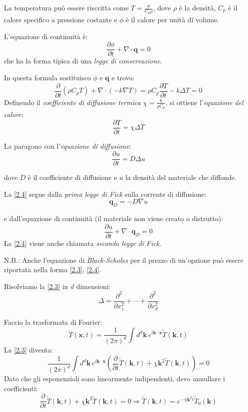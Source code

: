 \documentclass[a4paper,11pt]{report}
\newcommand{\vect}[1]{\boldsymbol{#1}}
\newcommand{\x}{\boldsymbol{x}}
\newcommand{\kk}{\boldsymbol{k}}
\begin{document}
La temperatura pu\`o essere riscritta come $T=\frac{\phi}{C_p \rho}$, dove $\rho$ \`e la densit\`a, $C_p$ \`e il calore specifico a pressione costante e $\phi$ \`e il calore per unit\`a di volume.

L'equazione di continuit\`a \`e:
\begin{equation}
\frac{\partial \phi}{\partial t} + \nabla\cdot\vect{q}=0
\end{equation}
che ha la forma tipica di una \emph{legge di conservazione}.

In questa formula sostituisco $\phi$ e $\vect{q}$ e trovo:
\[
\frac{\partial}{\partial t}(\rho C_p T) + \nabla\cdot(-k\nabla T) = \rho C_p \frac{\partial T}{\partial t} - k \Delta T=0
\]
Definendo il \emph{coefficiente di diffusione termica} $\chi=\frac{k}{\rho C_p}$, si ottiene l'\emph{equazione del calore}:
\begin{equation}
\frac{\partial T}{\partial t}=\chi \Delta T
\label{2.3}
\end{equation}

La paragono con l'\emph{equazione di diffusione}:
\begin{equation}
\frac{\partial u}{\partial t}=D \Delta u
\label{2.4}
\end{equation}

dove $D$ \`e il coefficiente di diffusione e $u$ la densit\`a del materiale che diffonde.

La \eqref{2.4} segue dalla \emph{prima legge di Fick} sulla corrente di diffusione:
\begin{equation}
\vect{q}_{D}=-D{\nabla}u
\end{equation}

e dall'equazione di continuit\`a (il materiale non viene creato o distrutto):
\[
\frac{\partial u}{\partial t}+{\nabla}\cdot\vect{q}_D=0
\]
La \eqref{2.4} viene anche chiamata \emph{seconda legge di Fick}.

N.B.: Anche l'equazione di \emph{Black-Scholes} per il prezzo di un'opzione pu\`o essere riportata nella forma \eqref{2.3}, \eqref{2.4}.

\medskip

Risolviamo la \eqref{2.3} in $d$ dimensioni:
\begin{equation}
\Delta=\frac{\partial^2}{\partial x_{1}^2}+\cdots+\frac{\partial^2}{\partial x_{d}^2} 
\end{equation}

Faccio la trasformata di Fourier:
\begin{equation}
T(\x,t)=\frac{1}{(2\pi)^d}\int d^d\kk\, e^{i\kk\cdot\x}\tilde{T}(\kk,t) 
\label{2.7}
\end{equation}
La \eqref{2.3} diventa:
\[
\frac{1}{(2\pi)^d}\int d^d \kk\, e^{i\kk\cdot\x }\left(\frac{\partial}{\partial t}\tilde{T}(\kk,t) + \chi \kk^2\tilde{T}(\kk,t)\right)=0 
\]
Dato che gli esponenziali sono linearmente indipendenti, devo annullare i coefficienti:
\begin{equation}
\frac{\partial}{\partial t}\tilde{T}(\kk,t) + \chi \kk^2\tilde{T}(\kk,t)=0 \Rightarrow \tilde{T}(\kk,t)=e^{-\chi\kk^2 t}\tilde{T}_0(\kk)
\label{2.8}
\end{equation}
\end{document}
